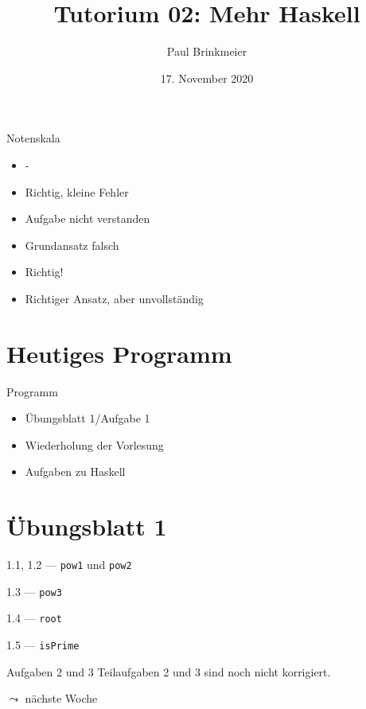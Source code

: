 \documentclass{beamer}
\title{Tutorium 02: Mehr Haskell}
\author{Paul Brinkmeier}
\institute{Tutorium Programmierparadigmen am KIT}
\date{17. November 2020}
\newcommand{\code}[1]{
	\begin{mdframed}
		
	\end{mdframed}
}
\begin{document}
\begin{frame}
	\titlepage
\end{frame}

\begin{frame}{Notenskala}
	\begin{itemize}
		\item -
		\item Richtig, kleine Fehler
		\item Aufgabe nicht verstanden
		\item Grundansatz falsch
		\item Richtig!
		\item Richtiger Ansatz, aber unvollständig
	\end{itemize}
\end{frame}

\section{Heutiges Programm}
\begin{frame}{Programm}
	\begin{itemize}
		\item Übungsblatt 1/Aufgabe 1
		\item Wiederholung der Vorlesung
		\item Aufgaben zu Haskell
	\end{itemize}
\end{frame}

\section{Übungsblatt 1}

\begin{frame}{1.1, 1.2 --- \texttt{pow1} und \texttt{pow2}}
	\code{../demos/Arithmetik1.hs}
\end{frame}

\begin{frame}{1.3 --- \texttt{pow3}}
	\code{../demos/Arithmetik2.hs}
\end{frame}

\begin{frame}{1.4 --- \texttt{root}}
	\code{../demos/Arithmetik3.hs}
\end{frame}

\begin{frame}{1.5 --- \texttt{isPrime}}
	\code{../demos/Arithmetik4.hs}
\end{frame}

\begin{frame}{Aufgaben 2 und 3}
  Teilaufgaben 2 und 3 sind noch nicht korrigiert.

  $\leadsto$ nächste Woche
\end{frame}
\end{document}

